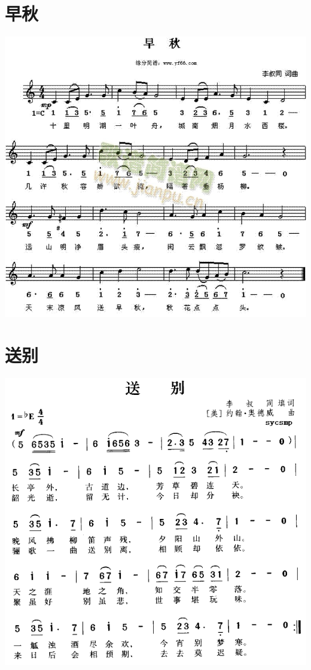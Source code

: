 \documentclass[cn,pad,chinesefont=nofont,twocol]{elegantbook}
\begin{document}
\section{早秋}
    \includegraphics[width=\textwidth]{dongxiao/20200909-李叔同-早秋.jpg} 
\section{送别}
    \includegraphics[width=\textwidth]{dongxiao/20200909-李叔同-送别.png} 
\end{document}
